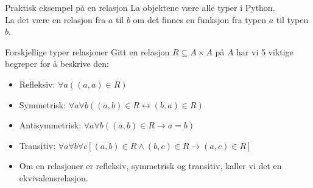 \begin{frame}[fragile]{Praktisk eksempel på en relasjon}
    La objektene være alle typer i Python. \\
    La det være en relasjon fra $a$ til $b$ om det finnes en funksjon fra typen $a$ til typen $b$.\\
    
\end{frame}

\begin{frame}{Forskjellige typer relasjoner}
Gitt en relasjon $R \subseteq A \times A$ på $A$ har vi 5 viktige begreper for å beskrive den:
    \begin{itemize}
        \item Refleksiv: $\forall a ((a, a) \in R)$
        \item Symmetrisk: $\forall a \forall b ((a, b) \in R \leftrightarrow (b, a) \in R)$
        \item Antisymmetrisk: $\forall a \forall b ((a, b) \in R \rightarrow a = b)$
        \item Transitiv: $\forall a \forall b \forall c [(a, b) \in R \land (b, c) \in R \rightarrow (a, c) \in R]$\\

        \item Om en relasjoner er refleksiv, symmetrisk og transitiv, kaller vi det en ekvivalensrelasjon.
    \end{itemize}   
\end{frame}

